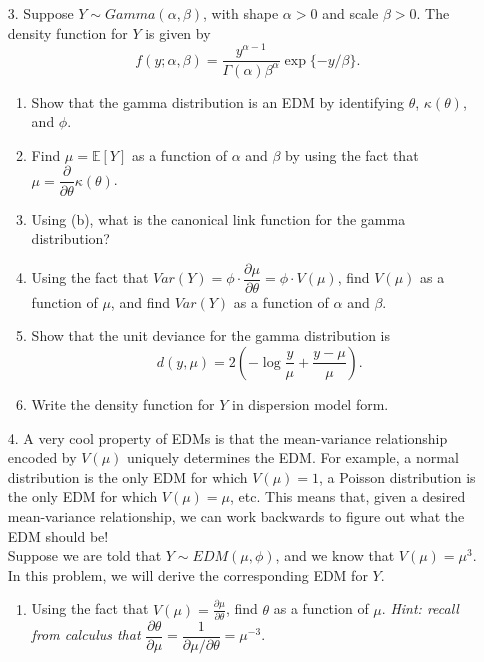 \documentclass[11pt]{article}
\begin{document}
\begin{enumerate}
\item[3.] Suppose $Y \sim Gamma(\alpha, \beta)$, with shape $\alpha > 0$ and scale $\beta > 0$. The density function for $Y$ is given by
$$f(y; \alpha, \beta) = \dfrac{y^{\alpha - 1}}{\Gamma(\alpha) \beta^\alpha} \exp \{ -y/\beta\}.$$

\begin{enumerate}
\item Show that the gamma distribution is an EDM by identifying $\theta$, $\kappa(\theta)$, and $\phi$.

\item Find $\mu = \mathbb{E}[Y]$ as a function of $\alpha$ and $\beta$ by using the fact that $\mu = \dfrac{\partial}{\partial \theta} \kappa(\theta)$.

\item Using (b), what is the canonical link function for the gamma distribution?

\item Using the fact that $Var(Y) = \phi \cdot \dfrac{\partial \mu}{\partial \theta} = \phi \cdot V(\mu)$, find $V(\mu)$ as a function of $\mu$, and find $Var(Y)$ as a function of $\alpha$ and $\beta$.

\item Show that the unit deviance for the gamma distribution is
$$d(y, \mu) = 2 \left( - \log \frac{y}{\mu} + \frac{y - \mu}{\mu} \right).$$

\item Write the density function for $Y$ in dispersion model form.
\end{enumerate}

\item[4.] A very cool property of EDMs is that the mean-variance relationship encoded by $V(\mu)$ uniquely determines the EDM. For example, a normal distribution is the only EDM for which $V(\mu) = 1$, a Poisson distribution is the only EDM for which $V(\mu) = \mu$, etc. This means that, given a desired mean-variance relationship, we can work backwards to figure out what the EDM should be!\\

Suppose we are told that $Y \sim EDM(\mu, \phi)$, and we know that $V(\mu) = \mu^3$. In this problem, we will derive the corresponding EDM for $Y$.

\begin{enumerate}
\item Using the fact that $V(\mu) = \frac{\partial \mu}{\partial \theta}$, find $\theta$ as a function of $\mu$. \textit{Hint: recall from calculus that} $\dfrac{\partial \theta}{\partial \mu} = \dfrac{1}{\partial \mu / \partial \theta} = \mu^{-3}$.


\end{enumerate}
\end{enumerate}
\end{document}
